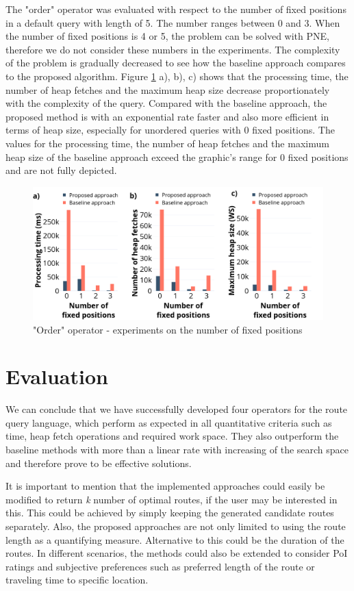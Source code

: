 The "order" operator was evaluated with respect to the number of fixed positions in a default query with length of 5. The number ranges between 0 and 3. When the number of fixed positions is 4 or 5, the problem can be solved with PNE, therefore we do not consider these numbers in the experiments. The complexity of the problem is gradually decreased to see how the baseline approach compares to the proposed algorithm.  
Figure \ref{fig:order} a), b), c) shows that the processing time, the number of heap fetches and the maximum heap size decrease proportionately with the complexity of the query. Compared with the baseline approach, the proposed method is with an exponential rate faster and also more efficient in terms of heap size, especially for unordered queries with 0 fixed positions. The values for the processing time, the number of heap fetches and the maximum heap size of the baseline approach exceed the graphic's range for 0 fixed positions and are not fully depicted. 

\begin{figure}[H]
	\includegraphics[scale=0.33]{images/order_30.png}
	\centering
	\caption{"Order" operator - experiments on the number of fixed positions}
	\label{fig:order}
\end{figure}

\section{Evaluation}
\label{sec:eval}

We can conclude that we have successfully developed four operators for the route query language, which perform as expected in all quantitative criteria such as time, heap fetch operations and required work space. They also outperform the baseline methods with more than a linear rate with increasing of the search space and therefore prove to be effective solutions.

It is important to mention that the implemented approaches could easily be modified to return \textit{k} number of optimal routes, if the user may be interested in this. This could be achieved by simply keeping the generated candidate routes separately. 
Also, the proposed approaches are not only limited to using the route length  as a quantifying measure. Alternative to this could be the duration of the routes. In different scenarios, the methods could also be extended to consider PoI ratings and subjective preferences such as preferred length of the route or traveling time to specific location.  

